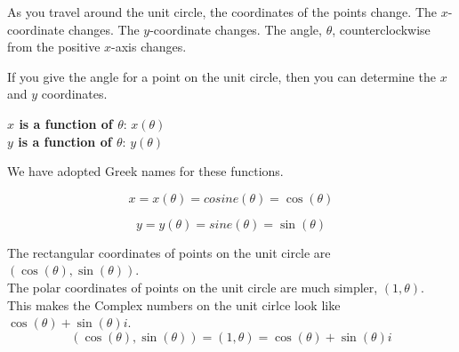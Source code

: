 \documentclass{ximera}
\begin{document}
\qquad


As you travel around the unit circle, the coordinates of the points change. The $x$-coordinate changes.  The $y$-coordinate changes. The angle, $\theta$, counterclockwise from the positive $x$-axis changes.   

If you give the angle for a point on the unit circle, then you can determine the $x$ and $y$ coordinates.


\begin{center}

\textbf{\textcolor{blue!55!black}{$x$ is a function of $\theta$}}: $x(\theta)$ \\

\textbf{\textcolor{blue!55!black}{$y$ is a function of $\theta$}}: $y(\theta)$ \\

\end{center}




We have adopted Greek names for these functions.



\[
x = x(\theta) = cosine(\theta) = \cos(\theta)
\]




\[
y = y(\theta) = sine(\theta) = \sin(\theta)
\]



The rectangular coordinates of points on the unit circle are $(\cos(\theta), \sin(\theta))$. \\

The polar coordinates of points on the unit circle are much simpler, $(1, \theta)$. \\

This makes the Complex numbers on the unit cirlce look like $\cos(\theta) + \sin(\theta) i$. \\




\[
(\cos(\theta), \sin(\theta)) = (1, \theta) = \cos(\theta) + \sin(\theta) i
\]

























\qquad
\end{document}
